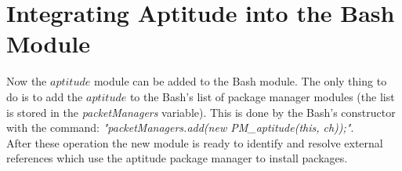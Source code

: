 \section{Integrating Aptitude into the Bash Module}\label{sec:aptitude_int}
Now the $aptitude$ module can be added to the Bash module.
The only thing to do is to add the $aptitude$ to the Bash's list of package manager modules (the list is stored in the \emph{packetManagers} variable).
This is done by the Bash's constructor with the command: \emph{"packetManagers.add(new PM\_aptitude(this, ch));"}.\\
After these operation the new module is ready to identify and resolve external references which use the aptitude package manager to install packages.